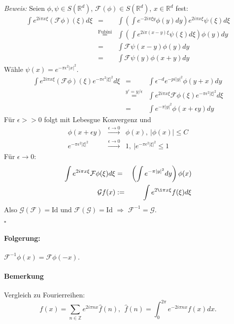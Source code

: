 \documentclass[12pt,a4paper,titlepage]{scrartcl}
\numberwithin{equation}{section}
\newcommand{\R}{\mathbb{R}} %
\newcommand{\Z}{\mathbb{Z}} %
\newcommand{\f}{\hat{f}}
\newcommand{\F}{\mathcal{F}}
\newcommand{\G}{\mathcal{G}}
\newcommand{\Bew}{\emph{Beweis: }}
\newcommand{\qed}{\begin{flushright}
		$\square$
	\end{flushright}}
\begin{document}
	\Bew Seien $\phi,\psi\in S(\R^d)$, $\F(\phi)\in S(\R^d)$, $x\in \R^d$ fest:
	\begin{eqnarray}
		\int e^{2i\pi x\xi}(\F\phi)(\xi)d\xi &=& \int \left(\int e^{-2i\pi \xi y}\phi(y) dy\right) e^{2i\pi x\xi} \psi(\xi)d\xi\nonumber\\
		&\overset{\text{Fubini}}{=}& \int\left(\int e^{2i\pi (x-y)\xi}\psi(\xi)d\xi\right)\phi(y)dy\nonumber\\
		&=& \int\F\psi(x-y)\phi(y)dy \nonumber\\
		&=& \int \F\psi(y)\phi(x+y)dy\nonumber
	\end{eqnarray}
	Wähle $\psi(x) = e^{-\pi\epsilon^2|x|^2}$.
	\begin{eqnarray}
		\int e^{2i\pi x\xi}(\F\phi)(\xi)e^{-\pi\epsilon^2|\xi|^2}d\xi &=& \int \epsilon^{-d} e^{-pi|y|^2}\phi(y+x)dy\nonumber\\
		&\overset{y' = y/\epsilon}{=}& \int e^{2i\pi x\xi}\F\phi (\xi) e^{-\pi\epsilon^2|\xi|^2}d\xi \nonumber \\
		&=& \int e^{-\pi |y|^2}\phi (x+\epsilon y)dy\nonumber
	\end{eqnarray}
	Für $\epsilon>> 0$ folgt mit Lebesgue Konvergenz und
	\begin{eqnarray}
		\phi(x+\epsilon y)&\overset{\epsilon\rightarrow 0}{\longrightarrow}&\phi(x),~|\phi(x)|\leq C\nonumber\\
		e^{-\pi\epsilon^2|\xi|^2}&\overset{\epsilon\rightarrow 0}{\longrightarrow}& 1, ~|e^{-\pi\epsilon^2|\xi|^2}\leq 1\nonumber
	\end{eqnarray}
	Für $\epsilon\rightarrow 0$:
	\begin{eqnarray}
		\int e^{2i\pi x\xi}\F\phi(\xi)d\xi &=& \left(\int e^{-\pi|y|^2}dy \right)\phi(x)\nonumber\\
		\G f(x)&:=& \int e^{2\i\pi x\xi}f(\xi)d\xi\nonumber
	\end{eqnarray}
	Also $\G(\F) = \text{Id}$ und $\F(\G) = \text{Id}$ $\Rightarrow$ $\F^{-1} = \G$.\qed
	
	\paragraph{Folgerung:} $\F^{-1}\phi(x) = \F\phi(-x)$.
	
	\paragraph{Bemerkung} Vergleich zu Fourierreihen: 
	$$f(x)=\sum_{n\in \Z} e^{2i\pi n x}\f(n),~~ \f(n) = \int_{0}^{2\pi}e^{-2i\pi n x}f(x) dx.$$
	
\end{document}
